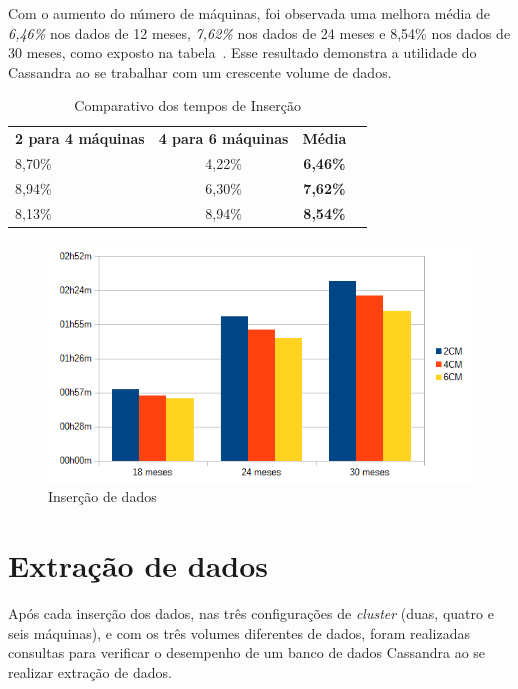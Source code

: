 Com o aumento do número de máquinas, foi observada uma melhora média de \emph{6,46\%} nos dados de 12 meses, \emph{7,62\%} nos dados de 24 meses e {8,54\%} nos dados de 30 meses, como exposto na tabela~\cite{tb:comparativo_insert}. Esse resultado demonstra a utilidade do Cassandra ao se trabalhar com um crescente volume de dados.

\begin{table}[]
	\centering
	\caption{Comparativo dos tempos de Inserção}
	\label{tb:comparativo_insert}
	\begin{tabular}{|l|c|c|l}
		\cline{1-3}
		\textbf{2 para 4 máquinas} & \textbf{4 para 6 máquinas} & \textbf{Média}  &  \\ \cline{1-3}
		8,70\%                     & 4,22\%                     & \textbf{6,46\%} &  \\ \cline{1-3}
		8,94\%                     & 6,30\%                     & \textbf{7,62\%} &  \\ \cline{1-3}
		8,13\%                     & 8,94\%                     & \textbf{8,54\%} &  \\ \cline{1-3}
	\end{tabular}
\end{table}

\begin{figure}[!htb]
	\centering
	\includegraphics[width=1\textwidth]{figuras/graphinsert.png}
	\caption{Inserção de dados}
	\label{fig:graph_insert}
\end{figure}

\section{Extração de dados}
Após cada inserção dos dados, nas três configurações de \emph{cluster} (duas, quatro e seis máquinas), e com os três volumes diferentes de dados, foram realizadas consultas para verificar o desempenho de um banco de dados Cassandra ao se realizar extração de dados.

